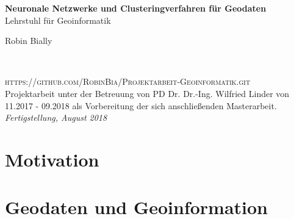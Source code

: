 \documentclass[11pt,fleqn]{book} %
\begin{document}

\begingroup
\thispagestyle{empty}
\centering
\vspace*{5cm}
\par\normalfont\fontsize{35}{35}\sffamily\selectfont
\textbf{{\color{white} Neuronale Netzwerke und Clusteringverfahren für Geodaten}}\\
{\LARGE {\color{white}Lehrstuhl für Geoinformatik}}\par
\vspace*{1cm}
{\Huge {\color{white} Robin Bially}}\par %
\endgroup

\newpage
~\vfill
\thispagestyle{empty}

\noindent \textsc{https://github.com/RobinBia/Projektarbeit-Geoinformatik.git}\\ %

\noindent Projektarbeit unter der Betreuung von PD Dr. Dr.-Ing. Wilfried Linder von 11.2017 - 09.2018 als Vorbereitung der sich anschließenden Masterarbeit.\\ 

\noindent \textit{Fertigstellung, August 2018} 

\tableofcontents %


\pagestyle{fancy} %

\chapter{Motivation}
\chapter{Geodaten und Geoinformation}
\end{document}
